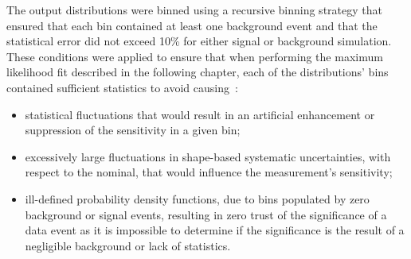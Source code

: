 The output distributions were binned using a recursive binning strategy that ensured that each bin contained at least one background event and that the statistical error did not exceed 10\% for either signal or background simulation.
These conditions were applied to ensure that when performing the maximum likelihood fit described in the following chapter, each of the distributions' bins contained sufficient statistics to avoid causing~\cite{combineNick,combinePietro}:
\begin{itemize}
\item statistical fluctuations that would result in an artificial enhancement or suppression of the sensitivity in a given bin;
\item excessively large fluctuations in shape-based systematic uncertainties, with respect to the nominal, that would influence the measurement's sensitivity;
\item ill-defined probability density functions, due to bins populated by zero background or signal events, resulting in zero trust of the significance of a data event as it is impossible to determine if the significance is the result of a negligible background or lack of statistics.
\end{itemize}


